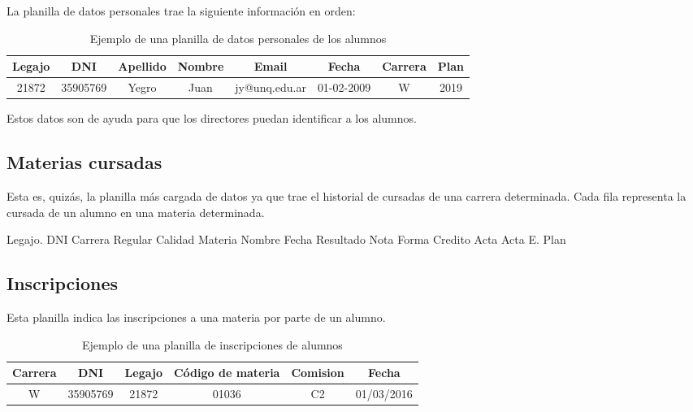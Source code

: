 La planilla de datos personales trae la siguiente información en orden: 

\begin{table}[]
    \centering
    \begin{tabular}{|c|c|c|c|c|c|c|c|}
    \hline
    Legajo & DNI & Apellido & Nombre & Email & Fecha & Carrera & Plan \\ \hline
    21872 & 35905769 & Yegro & Juan & jy@unq.edu.ar & 01-02-2009 & W & 2019 \\
    \hline
    \end{tabular}
    \caption{Ejemplo de una planilla de datos personales de los alumnos}
    \label{tab:tabla_datos}
\end{table}

Estos datos son de ayuda para que los directores puedan identificar a los alumnos.

\subsection[Materias cursadas]{Materias cursadas}

Esta es, quizás, la planilla más cargada de datos ya que trae el historial de cursadas de una carrera determinada. Cada fila representa la cursada de un alumno en una materia determinada.


\begin{outline}
    \2 Legajo.
    \2 DNI 
    \2 Carrera 
    \2 Regular 
    \2 Calidad 
    \2 Materia 
    \2 Nombre 
    \2 Fecha 
    \2 Resultado 
    \2 Nota 
    \2 Forma 
    \2 Credito 
    \2 Acta 
    \2 Acta E. 
    \2 Plan
\end{outline}

\subsection[Inscripciones]{Inscripciones}

Esta planilla indica las inscripciones a una materia por parte de un alumno.

\begin{table}[]
    \centering
    \makegapedcells
    \begin{tabular}{|c|c|c|c|c|c|}
    \hline
    Carrera & DNI & Legajo & Código de materia & Comision & Fecha  \\\hline
    W & 35905769 & 21872 & 01036 & C2 & 01/03/2016  \\
    \hline
    \end{tabular}
    \caption{Ejemplo de una planilla de inscripciones de alumnos}
    \label{tab:tabla_datos}
\end{table}


